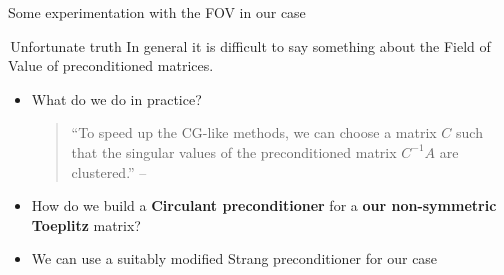 \documentclass[aspectratio=169,xcolor=dvipsnames]{beamer}
\begin{document}
\begin{frame}{Some experimentation with the FOV in our case}

\begin{exampleblock}{\faSadTear\,Unfortunate truth}
In general it is difficult to say something about the Field of Value of preconditioned matrices.
\end{exampleblock}

\begin{itemize}
	\item[\faQuestionCircle]<2-> What do we do in practice?
	\begin{quote}
		``To speed up the CG-like methods, we can choose a matrix $C$ such that the singular values of the preconditioned matrix $C^{-1}A$ are clustered.'' -- \parencite[P. 439]{MR1409592}
	\end{quote}
	\item[\faQuestionCircle]<3-> How do we build a \textbf{Circulant preconditioner} for a \textbf{our non-symmetric Toeplitz} matrix?
	\item[\faLightbulb]<4-> We can use a suitably modified Strang preconditioner for our case \parencite{MR3062056}
\end{itemize}

\end{frame}
\end{document}
